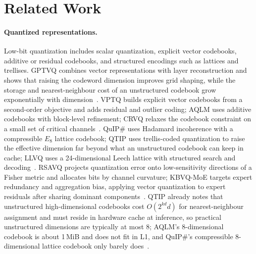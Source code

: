 \section{Related Work}

\paragraph{Quantized representations.}
Low-bit quantization includes scalar quantization, explicit vector codebooks, additive or residual codebooks, and structured encodings such as lattices and trellises.
GPTVQ combines vector representations with layer reconstruction and shows that raising the codeword dimension improves grid shaping, while the storage and nearest-neighbour cost of an unstructured codebook grow exponentially with dimension~\cite{gptvq}.
VPTQ builds explicit vector codebooks from a second-order objective and adds residual and outlier coding; AQLM uses additive codebooks with block-level refinement; CRVQ relaxes the codebook constraint on a small set of critical channels~\cite{vptq,aqlm,crvq}.
QuIP\# uses Hadamard incoherence with a compressible $E_8$ lattice codebook; QTIP uses trellis-coded quantization to raise the effective dimension far beyond what an unstructured codebook can keep in cache; LLVQ uses a 24-dimensional Leech lattice with structured search and decoding~\cite{quipsharp,qtip,llvq}.
RSAVQ projects quantization error onto low-sensitivity directions of a Fisher metric and allocates bits by channel curvature; KBVQ-MoE targets expert redundancy and aggregation bias, applying vector quantization to expert residuals after sharing dominant components~\cite{rsavq,kbvqmoe}.
QTIP already notes that unstructured high-dimensional codebooks cost $O(2^{kd}d)$ for nearest-neighbour assignment and must reside in hardware cache at inference, so practical unstructured dimensions are typically at most 8; AQLM's 8-dimensional codebook is about 1\,MiB and does not fit in L1, and QuIP\#'s compressible 8-dimensional lattice codebook only barely does~\cite{qtip,aqlm,quipsharp}.
